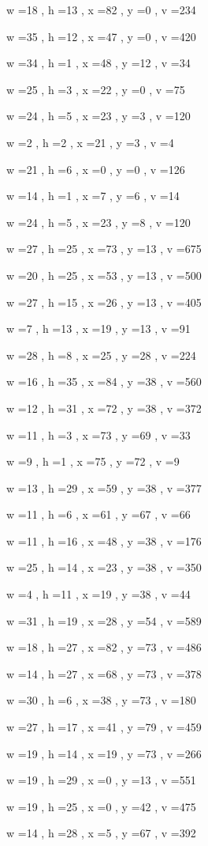 \documentclass[11pt]{article}
\begin{document}
w =18 , h =13 , x =82 , y =0 , v =234
\par
w =35 , h =12 , x =47 , y =0 , v =420
\par
w =34 , h =1 , x =48 , y =12 , v =34
\par
w =25 , h =3 , x =22 , y =0 , v =75
\par
w =24 , h =5 , x =23 , y =3 , v =120
\par
w =2 , h =2 , x =21 , y =3 , v =4
\par
w =21 , h =6 , x =0 , y =0 , v =126
\par
w =14 , h =1 , x =7 , y =6 , v =14
\par
w =24 , h =5 , x =23 , y =8 , v =120
\par
w =27 , h =25 , x =73 , y =13 , v =675
\par
w =20 , h =25 , x =53 , y =13 , v =500
\par
w =27 , h =15 , x =26 , y =13 , v =405
\par
w =7 , h =13 , x =19 , y =13 , v =91
\par
w =28 , h =8 , x =25 , y =28 , v =224
\par
w =16 , h =35 , x =84 , y =38 , v =560
\par
w =12 , h =31 , x =72 , y =38 , v =372
\par
w =11 , h =3 , x =73 , y =69 , v =33
\par
w =9 , h =1 , x =75 , y =72 , v =9
\par
w =13 , h =29 , x =59 , y =38 , v =377
\par
w =11 , h =6 , x =61 , y =67 , v =66
\par
w =11 , h =16 , x =48 , y =38 , v =176
\par
w =25 , h =14 , x =23 , y =38 , v =350
\par
w =4 , h =11 , x =19 , y =38 , v =44
\par
w =31 , h =19 , x =28 , y =54 , v =589
\par
w =18 , h =27 , x =82 , y =73 , v =486
\par
w =14 , h =27 , x =68 , y =73 , v =378
\par
w =30 , h =6 , x =38 , y =73 , v =180
\par
w =27 , h =17 , x =41 , y =79 , v =459
\par
w =19 , h =14 , x =19 , y =73 , v =266
\par
w =19 , h =29 , x =0 , y =13 , v =551
\par
w =19 , h =25 , x =0 , y =42 , v =475
\par
w =14 , h =28 , x =5 , y =67 , v =392
\par
\newpage
\end{document}
